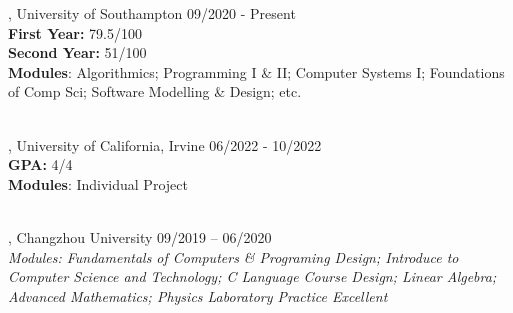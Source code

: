 
, University of Southampton	\hfill 09/2020 - Present
\\ \textbf{First Year:} 79.5/100 
\\ \textbf{Second Year:} 51/100
\\ \textbf{Modules}: Algorithmics; Programming I \& II; Computer Systems I; Foundations of Comp Sci; Software Modelling \& Design; etc.\\~

, University of California, Irvine  \hfill 06/2022 - 10/2022
\\ \textbf{GPA:} 4/4
\\ \textbf{Modules}: Individual Project\\~

, Changzhou University \hfill	09/2019 – 06/2020
\\ \textit{Modules: Fundamentals of Computers \& Programing Design; Introduce to Computer Science and Technology; C Language Course Design; Linear Algebra; Advanced Mathematics; Physics Laboratory Practice Excellent}



